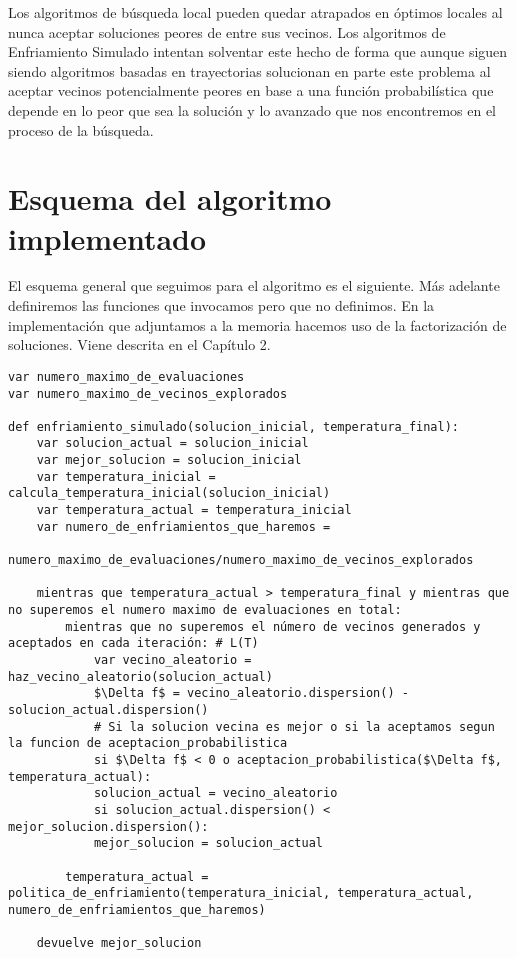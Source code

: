 Los algoritmos de búsqueda local
pueden quedar atrapados en óptimos locales al nunca aceptar soluciones
peores de entre sus vecinos. Los algoritmos de Enfriamiento Simulado intentan
solventar este hecho de forma que aunque
siguen siendo algoritmos basadas en trayectorias solucionan en parte
este problema al aceptar vecinos potencialmente peores
en base a una función probabilística que depende en lo peor que sea la solución y
lo avanzado que nos encontremos en el proceso de la búsqueda.

\begin{minipage}{\textwidth}

	\section{Esquema del algoritmo implementado}

	El esquema general que seguimos para el algoritmo es el siguiente. Más adelante definiremos las
	funciones que invocamos pero que no definimos. En la implementación que adjuntamos a la memoria
	hacemos uso de la factorización de soluciones. Viene descrita en el Capítulo 2.

	\begin{lstlisting}[mathescape=true,caption={Esquema general de un algoritmo basado en el Enfriamiento Simulado.},captionpos=b]
var numero_maximo_de_evaluaciones
var numero_maximo_de_vecinos_explorados

def enfriamiento_simulado(solucion_inicial, temperatura_final):
	var solucion_actual = solucion_inicial
	var mejor_solucion = solucion_inicial
	var temperatura_inicial = calcula_temperatura_inicial(solucion_inicial)
	var temperatura_actual = temperatura_inicial
	var numero_de_enfriamientos_que_haremos =
		numero_maximo_de_evaluaciones/numero_maximo_de_vecinos_explorados

	mientras que temperatura_actual > temperatura_final y mientras que no superemos el numero maximo de evaluaciones en total:
		mientras que no superemos el número de vecinos generados y aceptados en cada iteración:	# L(T)
			var vecino_aleatorio = haz_vecino_aleatorio(solucion_actual)
			$\Delta f$ = vecino_aleatorio.dispersion() - solucion_actual.dispersion()
			# Si la solucion vecina es mejor o si la aceptamos segun la funcion de aceptacion_probabilistica
			si $\Delta f$ < 0 o aceptacion_probabilistica($\Delta f$, temperatura_actual):
			solucion_actual = vecino_aleatorio
			si solucion_actual.dispersion() < mejor_solucion.dispersion():
			mejor_solucion = solucion_actual
	
		temperatura_actual = politica_de_enfriamiento(temperatura_inicial, temperatura_actual, numero_de_enfriamientos_que_haremos)
	
	devuelve mejor_solucion
	\end{lstlisting}
\end{minipage}

